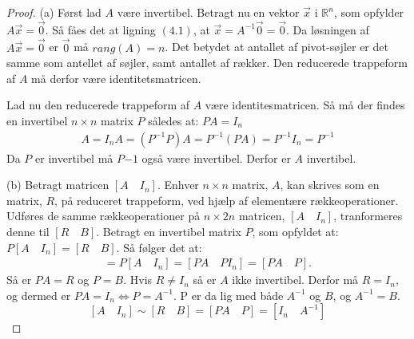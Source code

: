 \begin{proof}
(a) Først lad $A$ være invertibel. Betragt nu en vektor $\vec{x}$ i $\mathds{R}^n$, som opfylder $A\vec{x}=\vec{0}$. Så fåes det at ligning $(4.1)$, at $\vec{x}=A^{-1} \vec{0}=\vec{0}$. Da løsningen af  $A\vec{x}=\vec{0}$ er $\vec{0}$ må $rang(A)=n$. Det betydet at antallet af pivot-søjler er det samme som antellet af søjler, samt antallet af rækker. Den reducerede trappeform af $A$ må derfor være identitetsmatricen. 

Lad nu den reducerede trappeform af $A$ være identitesmatricen. Så må der findes en invertibel $n \times n$ matrix $P$ således at: $PA=I_n$
\begin{align*}
A=I_nA=(P^{-1}P)A=P^{-1}(PA)=P^{-1}I_n=P^{-1}
\end{align*}
Da $P$ er invertibel må $P{-1}$ også være invertibel. Derfor er $A$ invertibel. 

(b) Betragt matricen $[A \quad I_n]$. Enhver $n \times n$ matrix, $A$, kan skrives som en matrix, $R$, på reduceret trappeform, ved hjælp af elementære rækkeoperationer. Udføres de samme rækkeoperationer på $n \times 2n$ matricen, $[A \quad I_n]$, tranformeres denne til $[R \quad B]$. Betragt en invertibel matrix $P$, som opfyldet at: $P[A \quad I_n]=[R \quad B]$. Så følger det at:  
\begin{align*}
[R \quad B]=P[A \quad I_n]=[PA \quad PI_n]=[PA \quad P]. 
\end{align*}
Så er $PA=R$ og $P=B$. Hvis $R \neq I_n$ så er $A$ ikke invertibel. Derfor må $R=I_n$, og dermed er $PA=I_n\Leftrightarrow P=A^{-1}$. P er da lig med både $A^{-1}$ og $B$, og $A^{-1}=B$. 
$$[A \quad I_n]\sim[R \quad B]=[PA \quad P]=[I_n \quad A^{-1}]$$
\end{proof}


